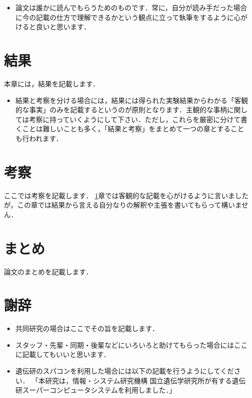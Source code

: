 \documentclass[dvipdfmx,autodetect-engine]{jsreport}
\begin{document}
\begin{itemize}
\item 論文は誰かに読んでもらうためのものです．常に，自分が読み手だった場合に今の記載の仕方で理解できるかという観点に立って執筆をするように心がけると良いと思います．
\end{itemize}

\chapter{結果}\label{sec:result}

本章には，結果を記載します．
\begin{itemize}
\item 結果と考察を分ける場合には，結果には得られた実験結果からわかる「客観的な事実」のみを記載するというのが原則となります．主観的な事柄に関しては考察に持っていくようにして下さい．ただし，これらを厳密に分けて書くことは難しいことも多く，「結果と考察」をまとめて一つの章とすることも行われます．
\end{itemize}

\chapter{考察}

ここでは考察を記載します．
\ref{sec:result}章では客観的な記載を心がけるように言いましたが，この章では結果から言える自分なりの解釈や主張を書いてもらって構いません．

\chapter{まとめ}

論文のまとめを記載します．

\chapter*{謝辞}

\begin{itemize}
\item 共同研究の場合はここでその旨を記載します．
\item スタッフ・先輩・同期・後輩などにいろいろと助けてもらった場合にはここに記載してもいいと思います．
\item 遺伝研のスパコンを利用した場合には以下の記載を行うようにしてください．
「本研究は，情報・システム研究機構 国立遺伝学研究所が有する遺伝研スーパーコンピュータシステムを利用しました．」
\end{itemize}
\end{document}
